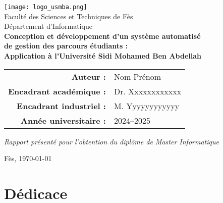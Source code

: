 \documentclass[french,12pt]{report} %
\begin{document}
\begin{titlepage}
  \centering
  \vspace*{2cm}
  \texttt{[image: logo\_usmba.png]}\\[1cm]

  {\Large Faculté des Sciences et Techniques de Fès\\[0.4cm]}
  {\large Département d'Informatique}\\[1.5cm]

  {\Huge\bfseries Conception et développement d'un système automatisé\\ de gestion des parcours étudiants :\\ Application à l'Université Sidi Mohamed Ben Abdellah\\[1cm]}

  \vfill
  \begin{tabular}{rl}
    \textbf{Auteur :} & Nom Prénom \\
    \textbf{Encadrant académique :} & Dr. Xxxxxxxxxxxx \\
    \textbf{Encadrant industriel :} & M. Yyyyyyyyyyyy \\
    \textbf{Année universitaire :} & 2024--2025 \\
  \end{tabular}
  \vfill
  \vspace*{1cm}
  \textit{Rapport présenté pour l'obtention du diplôme de Master Informatique}\\
  \vspace*{1cm}

  Fès, \today
\end{titlepage}


\chapter*{Dédicace}

\end{document}
